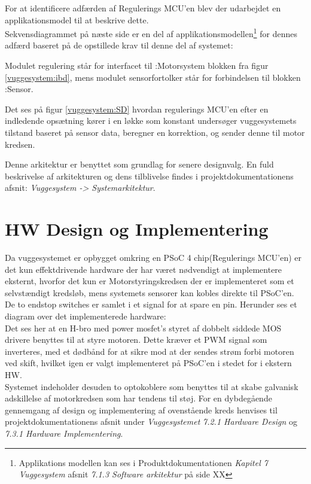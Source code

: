 For at identificere adfærden af Regulerings MCU'en blev der udarbejdet en applikationsmodel til at beskrive dette.\\Sekvensdiagrammet på næste side er en del af applikationsmodellen\footnote{Applikations modellen kan ses i Produktdokumentationen \textit{Kapitel 7 Vuggesystem} afsnit \textit{7.1.3 Software arkitektur} på side XX} for dennes adfærd baseret på de opstillede krav til denne del af systemet:


Modulet regulering står for interfacet til :Motorsystem blokken fra figur \ref{vuggesystem:ibd}, mens modulet sensorfortolker står for forbindelsen til blokken :Sensor.

Det ses på figur \ref{vuggesystem:SD} hvordan regulerings MCU'en efter en indledende opsætning kører i en løkke som konstant undersøger vuggesystemets tilstand baseret på sensor data, beregner en korrektion, og sender denne til motor kredsen.

Denne arkitektur er benyttet som grundlag for senere designvalg. En fuld beskrivelse af arkitekturen og dens tilblivelse findes i projektdokumentationens afsnit: \textit{Vuggesystem -> Systemarkitektur}.

\newpage
\section{HW Design og Implementering}
\label{vs_HW}
Da vuggesystemet er opbygget omkring en PSoC 4 chip(Regulerings MCU'en) er det kun effektdrivende hardware der har været nødvendigt at implementere eksternt, hvorfor det kun er Motorstyringskredsen der er implementeret som et selvstændigt kredsløb, mens systemets sensorer kan kobles direkte til PSoC'en. De to endstop switches er samlet i et signal for at spare en pin. Herunder ses et diagram over det implementerede hardware:\\
Det ses her at en H-bro med power mosfet's styret af dobbelt siddede MOS drivere benyttes til at styre motoren. Dette kræver et PWM signal som inverteres, med et dødbånd for at sikre mod at der sendes strøm forbi motoren ved skift, hvilket igen er valgt implementeret på PSoC'en i stedet for i ekstern HW. \\ Systemet indeholder desuden to optokoblere som benyttes til at skabe galvanisk adskillelse af motorkredsen som har tendens til støj.
For en dybdegående gennemgang af design og implementering af ovenstående kreds henvises til projektdokumentationens afsnit under \textit{Vuggesystemet} \textit{7.2.1 Hardware Design} og \textit{7.3.1 Hardware Implementering}.\\



